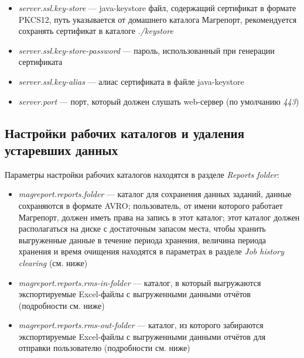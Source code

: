 \documentclass[../user-manual.tex]{subfiles}
\begin{document}
	\begin{itemize}
		\item \textit{server.ssl.key-store} --- java-keystore файл, содержащий сертификат в формате PKCS12, путь указывается от домашнего каталога Магрепорт, рекомендуется сохранять сертификат в каталоге \textit{./keystore}
		
		\item \textit{server.ssl.key-store-password} --- пароль, использованный при генерации сертификата
		
		\item \textit{server.ssl.key-alias} --- алиас сертификата в файле java-keystore
		
		\item \textit{server.port} --- порт, который должен слушать web-сервер (по умолчанию \textit{443})
	\end{itemize}
	
	\subsection{Настройки рабочих каталогов и удаления устаревших данных} \label{subsection:folders-settings}
	
	Параметры настройки рабочих каталогов находятся в разделе \textit{Reports folder}:
	
	\begin{itemize}
		\item \textit{magreport.reports.folder} --- каталог для сохранения данных заданий, данные сохраняются в формате AVRO; пользователь, от имени которого работает Магрепорт, должен иметь права на запись в этот каталог; этот каталог должен располагаться на диске с достаточным запасом места, чтобы хранить выгруженные данные в течение периода хранения, величина периода хранения и время очищения находятся в параметрах в разделе \textit{Job history clearing} (см. ниже)
		
		\item \textit{magreport.reports.rms-in-folder} --- каталог, в который выгружаются экспортируемые Excel-файлы с выгруженными данными отчётов (подробности см. ниже)
		
		\item \textit{magreport.reports.rms-out-folder} --- каталог, из которого забираются экспортируемые Excel-файлы с выгруженными данными отчётов для отправки пользователю (подробности см. ниже)
		
	\end{itemize}
\end{document}
